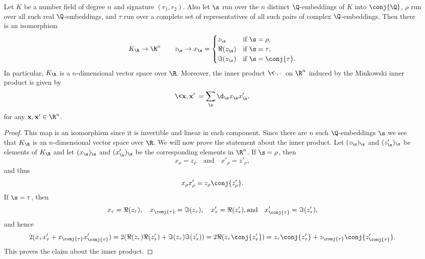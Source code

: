     \begin{proposition}\label{prop:Minkowski_space_isomorphism}
      Let $K$ be a number field of degree $n$ and signature $(r_{1},r_{2})$. Also let $\s$ run over the $n$ distinct $\Q$-embeddings of $K$ into $\conj{\Q}$, $\rho$ run over all such real $\Q$-embeddings, and $\tau$ run over a complete set of representatives of all such pairs of complex $\Q$-embeddings. Then there is an isomorphism
      \[
        K_{\R} \to \R^{n} \qquad z_{\s} \to x_{\s} = \begin{cases} z_{\s} & \text{if $\s = \rho$}, \\ \Re(z_{\s}) & \text{if $\s = \tau$}, \\ \Im(z_{\s}) & \text{if $\s = \conj{\tau}$}. \end{cases}
      \]
      In particular, $K_{\R}$ is a $n$-dimensional vector space over $\R$. Moreover, the inner product $\<\cdot,\cdot\>$ on $\R^{n}$ induced by the Minkowski inner product is given by
      \[
        \<\mathbf{x},\mathbf{x}'\> = \sum_{\s}\d_{\s}x_{\s}x'_{\s},
      \]
      for any $\mathbf{x},\mathbf{x}' \in \R^{n}$.
    \end{proposition}
    \begin{proof}
      This map is an isomorphism since it is invertible and linear in each component. Since there are $n$ such $\Q$-embeddings $\s$ we see that $K_{\R}$ is an $n$-dimensional vector space over $\R$. We will now prove the statement about the inner product. Let $(z_{\s})_{\s}$ and $(z'_{\s})_{\s}$ be elements of $K_{\R}$ and let $(x_{\s})_{\s}$ and $(x'_{\s})_{\s}$ be the corresponding elements in $\R^{n}$. If $\s = \rho$, then
      \[
        x_{\rho} = z_{\rho} \quad \text{and} \quad x'_{\rho} = z'_{\rho},
      \]
      and thus
      \[
        x_{\rho}x'_{\rho} = z_{\rho}\conj{z'_{\rho}}.
      \]
      If $\s = \tau$, then
      \[
        x_{\tau} = \Re(z_{\tau}), \quad x_{\conj{\tau}} = \Im(z_{\tau}), \quad x'_{\tau} = \Re(z'_{\tau}), \text{and} \quad x'_{\conj{\tau}} = \Im(z'_{\tau}),
      \]
      and hence
      \[
        2(x_{\tau}x'_{\tau}+x_{\conj{\tau}}x'_{\conj{\tau}}) = 2(\Re(z_{\tau})\Re(z'_{\tau})+\Im(z_{\tau})\Im(z'_{\tau})) = 2\Re(z_{\tau}\conj{z'_{\tau}}) = z_{\tau}\conj{z'_{\tau}}+z_{\conj{\tau}}\conj{z'_{\conj{\tau}}}.
      \]
      This proves the claim about the inner product.
    \end{proof}
    

